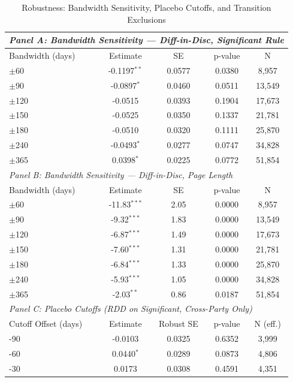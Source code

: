 \begin{table}[H]
\centering
\caption{Robustness: Bandwidth Sensitivity, Placebo Cutoffs, and Transition Exclusions}
\label{tab:robustness}
\begin{threeparttable}
\small
\begin{tabular}{lcccc}
\toprule
\multicolumn{5}{l}{\textit{Panel A: Bandwidth Sensitivity --- Diff-in-Disc, Significant Rule}} \\
\midrule
Bandwidth (days) & Estimate & SE & p-value & N \\
\midrule
$\pm$60 & -0.1197$^{**}$ & 0.0577 & 0.0380 & 8,957 \\
$\pm$90 & -0.0897$^{*}$ & 0.0460 & 0.0511 & 13,549 \\
$\pm$120 & -0.0515 & 0.0393 & 0.1904 & 17,673 \\
$\pm$150 & -0.0525 & 0.0350 & 0.1337 & 21,781 \\
$\pm$180 & -0.0510 & 0.0320 & 0.1111 & 25,870 \\
$\pm$240 & -0.0493$^{*}$ & 0.0277 & 0.0747 & 34,828 \\
$\pm$365 & 0.0398$^{*}$ & 0.0225 & 0.0772 & 51,854 \\
\midrule
\multicolumn{5}{l}{\textit{Panel B: Bandwidth Sensitivity --- Diff-in-Disc, Page Length}} \\
\midrule
Bandwidth (days) & Estimate & SE & p-value & N \\
\midrule
$\pm$60 & -11.83$^{***}$ & 2.05 & 0.0000 & 8,957 \\
$\pm$90 & -9.32$^{***}$ & 1.83 & 0.0000 & 13,549 \\
$\pm$120 & -6.87$^{***}$ & 1.49 & 0.0000 & 17,673 \\
$\pm$150 & -7.60$^{***}$ & 1.31 & 0.0000 & 21,781 \\
$\pm$180 & -6.84$^{***}$ & 1.33 & 0.0000 & 25,870 \\
$\pm$240 & -5.93$^{***}$ & 1.05 & 0.0000 & 34,828 \\
$\pm$365 & -2.03$^{**}$ & 0.86 & 0.0187 & 51,854 \\
\midrule
\multicolumn{5}{l}{\textit{Panel C: Placebo Cutoffs (RDD on Significant, Cross-Party Only)}} \\
\midrule
Cutoff Offset (days) & Estimate & Robust SE & p-value & N (eff.) \\
\midrule
-90 & -0.0103 & 0.0325 & 0.6352 & 3,999 \\
-60 & 0.0440$^{*}$ & 0.0289 & 0.0873 & 4,806 \\
-30 & 0.0173 & 0.0308 & 0.4591 & 4,351 \\

\end{tabular}
\end{threeparttable}
\end{table}
